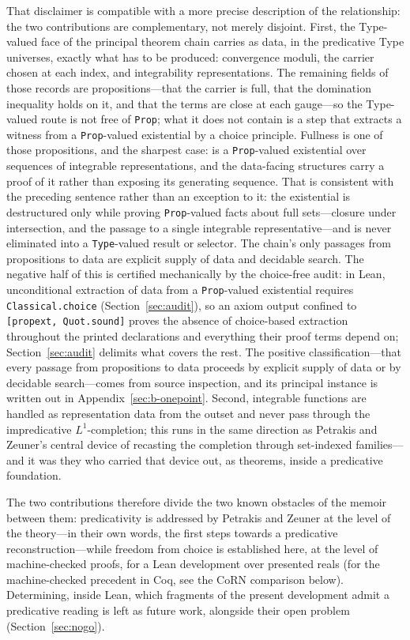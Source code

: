 \documentclass[11pt]{article}
\theoremstyle{definition}
\theoremstyle{remark}
\begin{document}
That disclaimer is compatible with a more precise description of the relationship: the two contributions are complementary, not merely disjoint.  First, the Type-valued face of the principal theorem chain carries as data, in the predicative Type universes, exactly what has to be produced: convergence moduli, the carrier chosen at each index, and integrability representations.  The remaining fields of those records are propositions---that the carrier is full, that the domination inequality holds on it, and that the terms are close at each gauge---so the Type-valued route is not free of \texttt{Prop}; what it does not contain is a step that extracts a witness from a \texttt{Prop}-valued existential by a choice principle.  Fullness is one of those propositions, and the sharpest case:  is a \texttt{Prop}-valued existential over sequences of integrable representations, and the data-facing structures carry a proof of it rather than exposing its generating sequence.  That is consistent with the preceding sentence rather than an exception to it: the existential is destructured only while proving \texttt{Prop}-valued facts about full sets---closure under intersection, and the passage to a single integrable representative---and is never eliminated into a \texttt{Type}-valued result or selector.  The chain's only passages from propositions to data are explicit supply of data and decidable search.  The negative half of this is certified mechanically by the choice-free audit: in Lean, unconditional extraction of data from a \texttt{Prop}-valued existential requires \texttt{Classical.choice} (Section~\ref{sec:audit}), so an axiom output confined to \texttt{[propext, Quot.sound]} proves the absence of choice-based extraction throughout the printed declarations and everything their proof terms depend on; Section~\ref{sec:audit} delimits what covers the rest.  The positive classification---that every passage from propositions to data proceeds by explicit supply of data or by decidable search---comes from source inspection, and its principal instance is written out in Appendix~\ref{sec:b-onepoint}.  Second, integrable functions are handled as representation data from the outset and never pass through the impredicative $L^1$-completion; this runs in the same direction as Petrakis and Zeuner's central device of recasting the completion through set-indexed families---and it was they who carried that device out, as theorems, inside a predicative foundation.

The two contributions therefore divide the two known obstacles of the memoir between them: predicativity is addressed by Petrakis and Zeuner at the level of the theory---in their own words, the first steps towards a predicative reconstruction---while freedom from choice is established here, at the level of machine-checked proofs, for a Lean development over presented reals (for the machine-checked precedent in Coq, see the CoRN comparison below).  Determining, inside Lean, which fragments of the present development admit a predicative reading is left as future work, alongside their open problem (Section~\ref{sec:nogo}).
\end{document}
